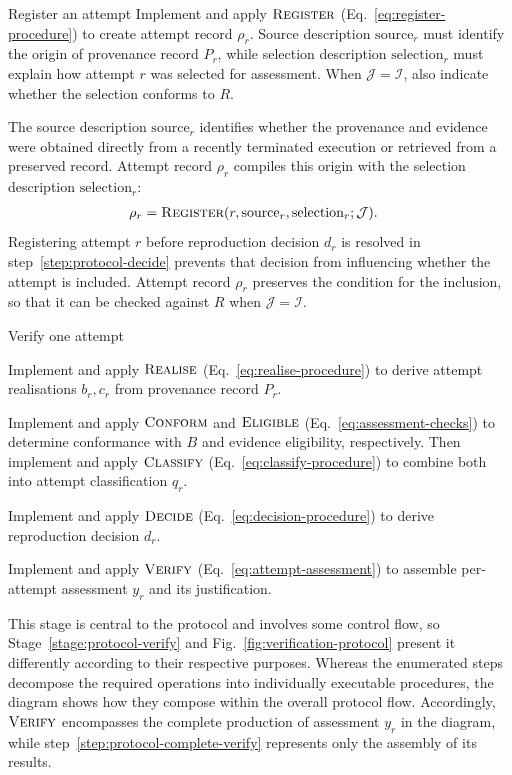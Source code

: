 \documentclass[conference,a4paper]{IEEEtran}
\begin{document}
  \begin{protocolstage}[single]{Register an attempt}
    \label{stage:protocol-register}
    \label{step:protocol-register}
    Implement and apply $\operatorname{\textsc{Register}}$ (Eq.~\eqref{eq:register-procedure}) to create attempt record $\rho_r$. Source description $\mathrm{source}_r$ must identify the origin of provenance record $P_r$, while selection description $\mathrm{selection}_r$ must explain how attempt $r$ was selected for assessment. When $\mathcal J=\mathcal I$, also indicate whether the selection conforms to $R$.
  \end{protocolstage}
  The source description $\mathrm{source}_r$ identifies whether the provenance and evidence were obtained directly from a recently terminated execution or retrieved from a preserved record. Attempt record $\rho_r$ compiles this origin with the selection description $\mathrm{selection}_r$:
  \begin{align}
    \rho_r &=\operatorname{\textsc{Register}}
      (r,\mathrm{source}_r,\mathrm{selection}_r;\mathcal J).
      \label{eq:register-procedure}
  \end{align}
  Registering attempt $r$ before reproduction decision $d_r$ is resolved in step~\ref{step:protocol-decide} prevents that decision from influencing whether the attempt is included. Attempt record $\rho_r$ preserves the condition for the inclusion, so that it can be checked against $R$ when $\mathcal J=\mathcal I$.

  \begin{protocolstage}{Verify one attempt}
    \label{stage:protocol-verify}
    \item\label{step:protocol-realise}
      Implement and apply $\operatorname{\textsc{Realise}}$ (Eq.~\eqref{eq:realise-procedure}) to derive attempt realisations $b_r,c_r$ from provenance record $P_r$.
    \item\label{step:protocol-classify}
      Implement and apply $\operatorname{\textsc{Conform}}$ and $\operatorname{\textsc{Eligible}}$ (Eq.~\eqref{eq:assessment-checks}) to determine conformance with $B$ and evidence eligibility, respectively. Then implement and apply $\operatorname{\textsc{Classify}}$ (Eq.~\eqref{eq:classify-procedure}) to combine both into attempt classification $q_r$.
    \item\label{step:protocol-decide}
      Implement and apply $\operatorname{\textsc{Decide}}$ (Eq.~\eqref{eq:decision-procedure}) to derive reproduction decision $d_r$.
    \item\label{step:protocol-complete-verify}
      Implement and apply $\operatorname{\textsc{Verify}}$ (Eq.~\eqref{eq:attempt-assessment}) to assemble per-attempt assessment $y_r$ and its justification.
  \end{protocolstage}
  This stage is central to the protocol and involves some control flow, so Stage~\ref{stage:protocol-verify} and Fig.~\ref{fig:verification-protocol} present it differently according to their respective purposes. Whereas the enumerated steps decompose the required operations into individually executable procedures, the diagram shows how they compose within the overall protocol flow. Accordingly, $\operatorname{\textsc{Verify}}$ encompasses the complete production of assessment $y_r$ in the diagram, while step~\ref{step:protocol-complete-verify} represents only the assembly of its results.
\end{document}
